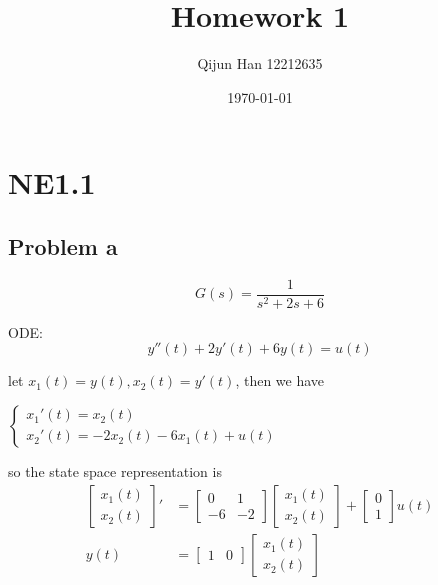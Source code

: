 \documentclass[12pt,a4paper]{article}
\title{Homework 1} %
\author{Qijun Han 12212635}
\date{\today}
\begin{document}
\maketitle

\section{NE1.1}
\subsection{Problem a}

\[G(s) = \frac{1}{s^2+2s+6}\]

ODE:
\[y''(t) + 2y'(t) + 6y(t) = u(t)\]

let $x_1(t) = y(t), x_2(t) = y'(t)$, then we have

$\begin{cases}
    x_1'(t) = x_2(t) \\
    x_2'(t) = -2x_2(t) - 6x_1(t) + u(t)
\end{cases}
$

so the state space representation is
\begin{equation}
    \begin{aligned}
        \begin{bmatrix}
            {x_1(t)} \\
            {x_2(t)}
        \end{bmatrix}' & = \begin{bmatrix}
                               0  & 1  \\
                               -6 & -2
                           \end{bmatrix} \begin{bmatrix}
                                             x_1(t) \\
                                             x_2(t)
                                         \end{bmatrix} + \begin{bmatrix}
                                                             0 \\
                                                             1
                                                         \end{bmatrix} u(t) \\
        y(t)               & = \begin{bmatrix}
                                1 & 0
                            \end{bmatrix} \begin{bmatrix}
                                              x_1(t) \\
                                              x_2(t)
                                          \end{bmatrix}
    \end{aligned}
\end{equation}
\end{document}
